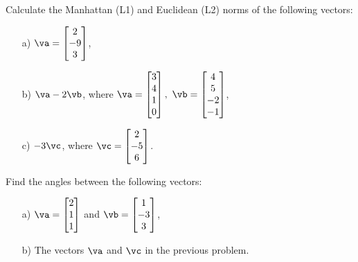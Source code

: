 \begin{problem}
    Calculate the Manhattan (L1) and Euclidean (L2) norms of the following vectors:

    \begin{enumerate}
        \item[a) ] $\va= \begin{bmatrix} 2\\-9\\3 \end{bmatrix}$,
        
        \item[b) ] $\va-2\vb$, where $\va= \begin{bmatrix}3\\4\\1\\0\end{bmatrix},\  \vb = \begin{bmatrix}4\\5\\-2\\-1\end{bmatrix}$,
        
        \item[c) ] $-3\vc$, where $\vc= \begin{bmatrix}2\\-5\\6\end{bmatrix}$.
    \end{enumerate}

\end{problem}
\medskip



\begin{problem}
    Find the angles between the following vectors:

    \begin{enumerate}
        \item[a) ] $\va= \begin{bmatrix} 2\\1\\1\end{bmatrix}$ and $\vb= \begin{bmatrix} 1\\-3\\3\end{bmatrix}$,
        
        \item[b) ] The vectors $\va$ and $\vc$ in the previous problem.

    \end{enumerate}
\end{problem}
\medskip




